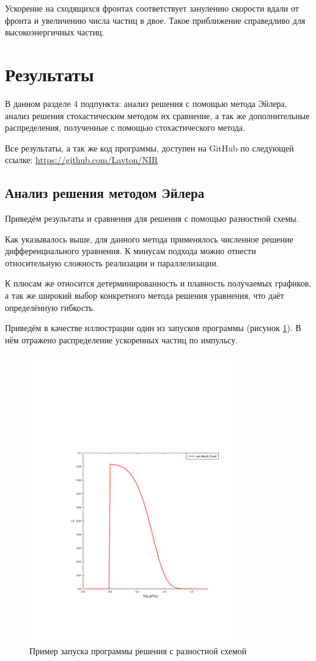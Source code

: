 \documentclass[a4paper,14pt]{extarticle} %
\begin{document}
Ускорение на сходящихся фронтах соответствует занулению скорости вдали от фронта и увеличению числа частиц в двое. Такое приближение справедливо для высокоэнергичных частиц.

\section{Результаты}
В данном разделе 4 подпункта: анализ решения с помощью метода Эйлера, анализ решения стохастическим методом их сравнение, а так же дополнительные распределения, полученные с помощью стохастического метода.

Все результаты, а так же код программы, доступен на GitHub по следующей ссылке: \url{https://github.com/Lavton/NIR}
\subsection{Анализ решения методом Эйлера}
Приведём результаты и сравнения для решения с помощью разностной схемы. 

Как указывалось выше, для данного метода применялось численное решение дифференциального уравнения. К минусам подхода можно отнести относительную сложность реализации и параллелизации. 

К плюсам же относится детерминированность и плавность получаемых графиков, а так же широкий выбор конкретного метода решения уравнения, что даёт определённую гибкость.

Приведём в качестве иллюстрации один из запусков программы (рисунок \ref{res/razn/common}). В нём отражено распределение ускоренных частиц по импульсу.
\begin{figure}[H]
\centering
\includegraphics[width=250pt]{r_common}
\caption{Пример запуска программы решения с разностной схемой}
\label{res/razn/common}
\end{figure}
\end{document}
